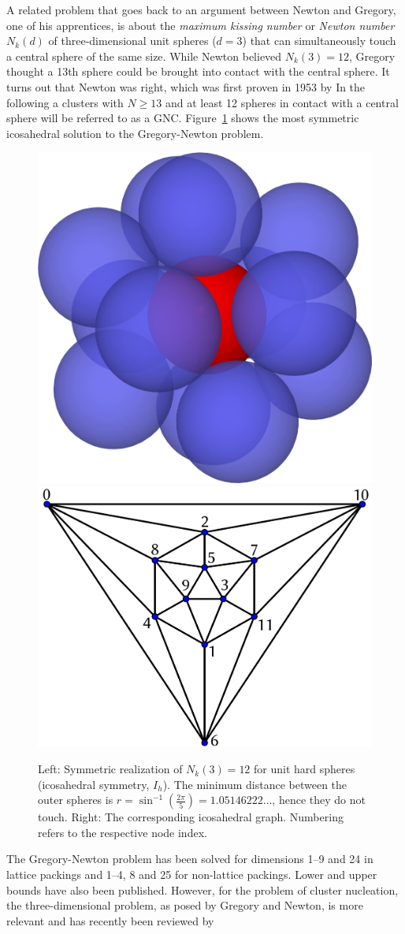 A related problem that goes back to an argument between Newton and Gregory, one of his
apprentices, is about the \emph{maximum kissing number}
or \emph{Newton number} $N_k(d)$ of three-dimensional unit spheres ($d=3$) that
can simultaneously touch a central sphere of the same
size.\autocite{Pfender_KissingNumbersSphere_2004} While Newton believed
$N_k(3)=12$, Gregory thought a 13th sphere could be brought into contact with
the central sphere. It turns out that Newton was right, which was first proven
in 1953 by
\citeauthor{Schutte_ProblemdreizehnKugeln_1952}\autocite{Schutte_ProblemdreizehnKugeln_1952}
In the following a clusters with $N\geq 13$ and at least 12 spheres in contact
with a central sphere will be referred to as a \acf{GNC}. Figure~\ref{fig:GN}
shows the most symmetric icosahedral solution to the Gregory-Newton problem.
%
\begin{figure}[htb]
    \centering
    \includegraphics[width=.4\textwidth]{gregory-newton/Kissing-3d.png} \quad
    \includegraphics[width=.5\textwidth]{gregory-newton/ico.pdf}
    \caption{Left: Symmetric realization of $N_k(3)=12$ for unit hard spheres
    (icosahedral symmetry, $I_h$). The minimum distance between the outer
    spheres is $r=\sin^{-1}\left(\frac{2\pi}{5}\right)=1.05146222\dots$,
    hence they do not touch. Right: The corresponding icosahedral graph.
    Numbering refers to the respective node index.}
    \label{fig:GN}
\end{figure}
%
The Gregory-Newton problem has been solved for dimensions 1--9 and 24 in lattice
packings and 1--4, 8 and 25 for non-lattice
packings.\autocite{Musin_kissingnumberfour_2008,Conway_SpherePackingsLattices_1999,Musin_proof24cellconjecture_2018}
Lower and upper bounds have also been
published.\autocite{Mittelmann_Highaccuracysemidefiniteprogramming_2010,Conway_SpherePackingsLattices_1999}
However, for the problem of cluster nucleation, the three-dimensional problem,
as posed by Gregory and Newton, is more relevant and has recently been reviewed
by
\citeauthor{Kusner_ConfigurationSpacesEqual_2018}\autocite{Kusner_ConfigurationSpacesEqual_2018}


